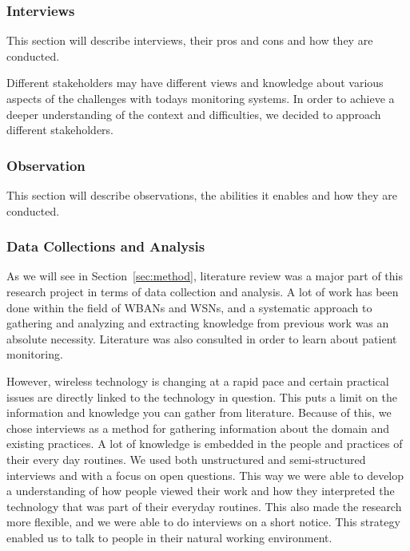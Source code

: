\subsubsection{Interviews} %
\label{ssub:interviews}

This section will describe interviews, their pros and cons and how they are conducted.

Different stakeholders may have different views and knowledge about various aspects of the challenges with todays monitoring systems. In order to achieve a deeper understanding of the context and difficulties, we decided to approach different stakeholders.


\subsubsection{Observation} %
\label{ssub:observation}

This section will describe observations, the abilities it enables and how they are conducted.


\subsubsection{Data Collections and Analysis} %
\label{ssub:data_collections_and_analysis}

As we will see in Section~\ref{sec:method}, literature review was a major part of this research project in terms of data collection and analysis. A lot of work has been done within the field of WBANs and WSNs, and a systematic approach to gathering and analyzing and extracting knowledge from previous work was an absolute necessity. Literature was also consulted in order to learn about patient monitoring.

However, wireless technology is changing at a rapid pace and certain practical issues are directly linked to the technology in question. This puts a limit on the information and knowledge you can gather from literature. Because of this, we chose interviews as a method for gathering information about the domain and existing practices. A lot of knowledge is embedded in the people and practices of their every day routines. We used both unstructured and semi-structured interviews and with a focus on open questions. This way we were able to develop a understanding of how people viewed their work and how they interpreted the technology that was part of their everyday routines. This also made the research more flexible, and we were able to do interviews on a short notice. This strategy enabled us to talk to people in their natural working environment.

